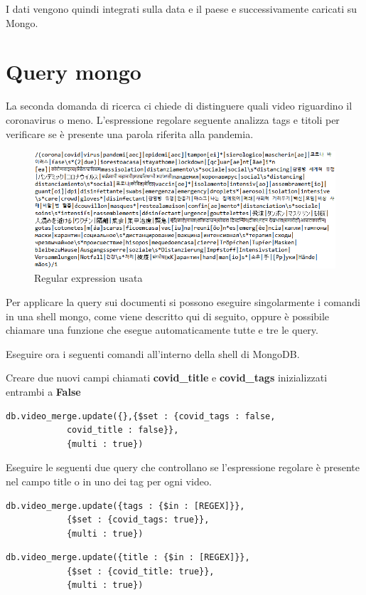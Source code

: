 \documentclass[10pt, a4paper,openany]{article}
\begin{document}
I dati vengono quindi integrati sulla data e il paese e successivamente caricati su Mongo.

\section*{Query mongo}

La seconda domanda di ricerca ci chiede di distinguere quali video riguardino il coronavirus o meno. L'espressione regolare seguente analizza tags e titoli per verificare se è presente una parola riferita alla pandemia.

\begin{figure}[H]
	\centering
	\includegraphics[height=0.4 \linewidth]{er.png}
	\caption{Regular expression usata}
\end{figure}

Per applicare la query sui documenti si possono eseguire singolarmente i comandi in una shell mongo, come viene descritto qui di seguito, oppure è possibile chiamare una funzione che esegue automaticamente tutte e tre le query. 

Eseguire ora i seguenti comandi all'interno della shell di MongoDB.

Creare due nuovi campi chiamati \textbf{covid\_title} e \textbf{covid\_tags} inizializzati entrambi a \textbf{False} 

\begin{Verbatim}[frame=single,baselinestretch=0.1]
db.video_merge.update({},{$set : {covid_tags : false, 
			covid_title : false}},
			{multi : true})
\end{Verbatim}
Eseguire le seguenti due query che controllano se l'espressione regolare è presente nel campo title o in uno dei tag per ogni video.

\begin{Verbatim}[frame=single,baselinestretch=0.1]
db.video_merge.update({tags : {$in : [REGEX]}}, 
			{$set : {covid_tags: true}}, 
			{multi : true})
\end{Verbatim}
 \begin{Verbatim}[frame=single,baselinestretch=0.1]
db.video_merge.update({title : {$in : [REGEX]}}, 
			{$set : {covid_title: true}}, 
			{multi : true})
\end{Verbatim}
\end{document}
